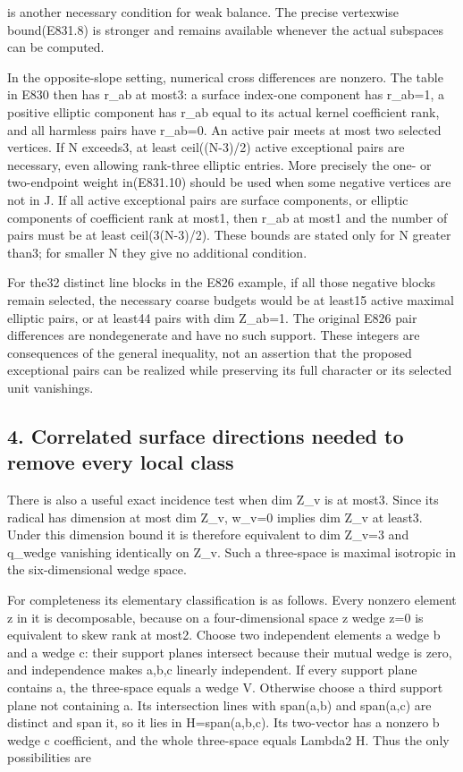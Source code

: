 is another necessary condition for weak balance. The precise vertexwise
bound(E831.8) is stronger and remains available whenever the actual
subspaces can be computed.

In the opposite-slope setting, numerical cross differences are nonzero. The
table in E830 then has r\_ab at most3: a surface index-one component has
r\_ab=1, a positive elliptic component has r\_ab equal to its actual kernel
coefficient rank, and all harmless pairs have r\_ab=0. An active pair meets
at most two selected vertices. If N exceeds3, at least ceil((N-3)/2) active
exceptional pairs are necessary, even allowing rank-three elliptic entries.
More precisely the one- or two-endpoint weight in(E831.10) should be used
when some negative vertices are not in J. If all active exceptional pairs
are surface components, or elliptic components of coefficient rank at most1,
then r\_ab at most1 and the number of pairs must be at least ceil(3(N-3)/2).
These bounds are stated only for N greater than3; for smaller N they give no
additional condition.

For the32 distinct line blocks in the E826 example, if all those negative
blocks remain selected, the necessary coarse budgets would be at least15
active maximal elliptic pairs, or at least44 pairs with dim Z\_ab=1. The
original E826 pair differences are nondegenerate and have no such support.
These integers are consequences of the general inequality, not an assertion
that the proposed exceptional pairs can be realized while preserving its
full character or its selected unit vanishings.

\subsection{4. Correlated surface directions needed to remove every local
class}\label{SF-E831:correlated-surface-directions-needed-to-remove-every-local-class}

There is also a useful exact incidence test when dim Z\_v is at most3. Since
its radical has dimension at most dim Z\_v, w\_v=0 implies dim Z\_v at
least3. Under this dimension bound it is therefore equivalent to dim Z\_v=3
and q\_wedge vanishing identically on Z\_v. Such a three-space is maximal
isotropic in the six-dimensional wedge space.

For completeness its elementary classification is as follows. Every nonzero
element z in it is decomposable, because on a four-dimensional space z wedge
z=0 is equivalent to skew rank at most2. Choose two independent elements a
wedge b and a wedge c: their support planes intersect because their mutual
wedge is zero, and independence makes a,b,c linearly independent. If every
support plane contains a, the three-space equals a wedge V. Otherwise choose
a third support plane not containing a. Its intersection lines with
span(a,b) and span(a,c) are distinct and span it, so it lies in
H=span(a,b,c). Its two-vector has a nonzero b wedge c coefficient, and the
whole three-space equals Lambda2 H. Thus the only possibilities are

